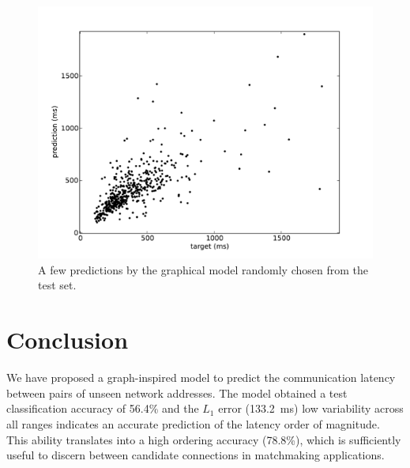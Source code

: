\documentclass[10pt,a4paper,notitlepage,twocolumn]{article}
\begin{document}



\begin{figure}[h]
\centering
\includegraphics[width=\columnwidth]{full_scatter}
\caption{A few predictions by the graphical model randomly chosen from the test set.}
\label{fig:samples}
\end{figure}


\section{Conclusion}

We have proposed a graph-inspired model to predict the communication latency between pairs of unseen network addresses.
The model obtained a test classification accuracy of 56.4\% and the $L_1$ error (133.2~ms) low variability across all ranges indicates an accurate prediction of the latency order of magnitude.
This ability translates into a high ordering accuracy (78.8\%), which is sufficiently useful to discern between candidate connections in matchmaking applications.
\end{document}
